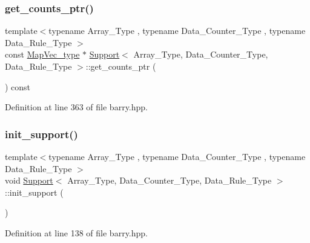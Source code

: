 \subsubsection{\texorpdfstring{get\+\_\+counts\+\_\+ptr()}{get\_counts\_ptr()}}
{\footnotesize\ttfamily template$<$typename Array\+\_\+\+Type , typename Data\+\_\+\+Counter\+\_\+\+Type , typename Data\+\_\+\+Rule\+\_\+\+Type $>$ \\
const \hyperlink{namespacebarry_a2f0d3aab1d67e4c8eaeab9022e16139f}{Map\+Vec\+\_\+type} $\ast$ \hyperlink{classbarry_1_1_support}{Support}$<$ Array\+\_\+\+Type, Data\+\_\+\+Counter\+\_\+\+Type, Data\+\_\+\+Rule\+\_\+\+Type $>$\+::get\+\_\+counts\+\_\+ptr (\begin{DoxyParamCaption}{ }\end{DoxyParamCaption}) const\hspace{0.3cm}{\ttfamily [inline]}}



Definition at line 363 of file barry.\+hpp.

\mbox{\label{classbarry_1_1_support_ae1fb3da18406ade3adc254e408d5f87b}} 
\subsubsection{\texorpdfstring{init\+\_\+support()}{init\_support()}}
{\footnotesize\ttfamily template$<$typename Array\+\_\+\+Type , typename Data\+\_\+\+Counter\+\_\+\+Type , typename Data\+\_\+\+Rule\+\_\+\+Type $>$ \\
void \hyperlink{classbarry_1_1_support}{Support}$<$ Array\+\_\+\+Type, Data\+\_\+\+Counter\+\_\+\+Type, Data\+\_\+\+Rule\+\_\+\+Type $>$\+::init\+\_\+support (\begin{DoxyParamCaption}{ }\end{DoxyParamCaption})\hspace{0.3cm}{\ttfamily [inline]}}



Definition at line 138 of file barry.\+hpp.

\mbox{\label{classbarry_1_1_support_af87b2e85ec72e394387946023508e7fd}} 
